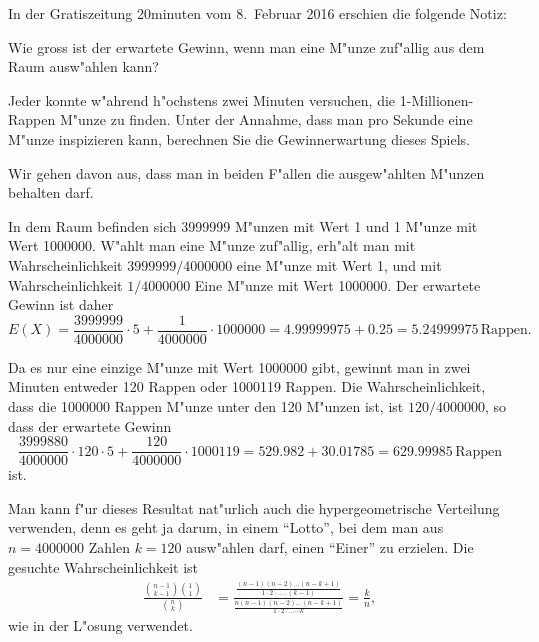In der Gratiszeitung 20minuten vom 8.~Februar 2016 erschien die folgende
Notiz:
\begin{center}
\end{center}
\begin{teilaufgaben}
\item Wie gross ist der erwartete Gewinn, wenn man eine M"unze zuf"allig
aus dem Raum ausw"ahlen kann?
\item
Jeder konnte w"ahrend h"ochstens zwei Minuten versuchen, die 1-Millionen-Rappen
M"unze zu finden. 
Unter der Annahme, dass man pro Sekunde eine M"unze inspizieren kann, 
berechnen Sie die Gewinnerwartung dieses Spiels.
\end{teilaufgaben}
Wir gehen davon aus, dass man in beiden F"allen die ausgew"ahlten M"unzen
behalten darf.

\begin{loesung}
\begin{teilaufgaben}
\item
In dem Raum befinden sich 3999999 M"unzen mit Wert 1 und 1 M"unze mit
Wert 1000000.
W"ahlt man eine M"unze zuf"allig, erh"alt man mit Wahrscheinlichkeit
$3999999/4000000$ eine M"unze mit Wert 1, und mit Wahrscheinlichkeit
$1/4000000$ Eine M"unze mit Wert 1000000.
Der erwartete Gewinn ist daher
\[
E(X) = \frac{3999999}{4000000}\cdot 5 + \frac{1}{4000000}\cdot 1000000
=4.99999975 + 0.25 = 5.24999975\,\text{Rappen}.
\]
\item
Da es nur eine einzige M"unze mit Wert 1000000 gibt, gewinnt man
in zwei Minuten entweder 120 Rappen oder 1000119 Rappen.
Die Wahrscheinlichkeit, dass die 1000000 Rappen M"unze unter den
120 M"unzen ist, ist $120/4000000$, so dass der erwartete Gewinn
\[
\frac{3999880}{4000000}\cdot 120\cdot 5
+
\frac{120}{4000000}\cdot 1000119
=
529.982 + 30.01785=629.99985\,\text{Rappen}
\]
ist.
\end{teilaufgaben}
\end{loesung}

\begin{diskussion}
Man kann f"ur dieses Resultat nat"urlich auch die hypergeometrische
Verteilung verwenden, denn es geht ja darum, in einem ``Lotto'', bei dem
man aus $n=4000000$ Zahlen $k=120$ ausw"ahlen darf, einen ``Einer''
zu erzielen.
Die gesuchte Wahrscheinlichkeit ist
\begin{align*}
\frac{\displaystyle\binom{n-1}{k-1}\binom{1}{1}}{\displaystyle\binom{n}{k}}
&=
\frac{\displaystyle\frac{(n-1)(n-2)\dots(n-k+1)}{1\cdot 2\cdot\dots\cdot (k-1)}}%
{\displaystyle\frac{n(n-1)(n-2)\dots(n-k+1)}{1\cdot 2\cdot\dots\cdots k}}
=\frac{k}{n},
\end{align*}
wie in der L"osung verwendet.
\end{diskussion}

